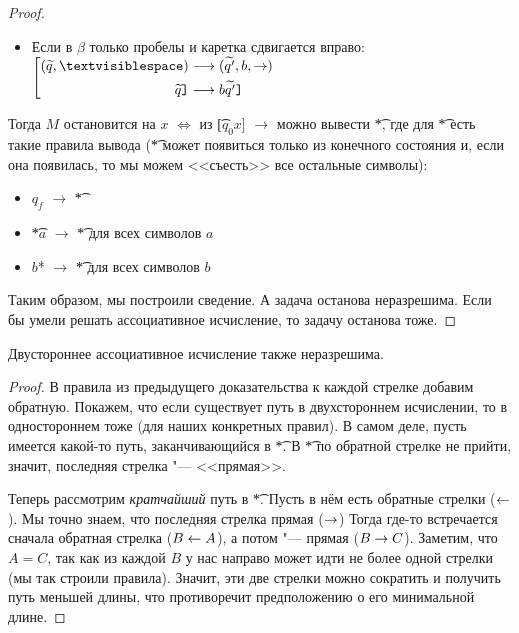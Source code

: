 \begin{proof}
\begin{itemize}
	\item Если в $\beta$ только пробелы и каретка сдвигается вправо:
		$\left[
			\begin{aligned}
				(\widetilde{q}, \textvisiblespace) &\longrightarrow (\widetilde{q'}, b, \rightarrow) \\
				\widetilde{q}\t{]} &\longrightarrow b\widetilde{q'}\t{]}
			\end{aligned}
		\right.$
	\end{itemize}

   Тогда $M$ остановится на $x$ $\iff$ из \t{[$q_0$$x$]} $\rightarrow$ можно вывести \t{*}, где для \t{*} есть такие правила вывода
   (\t{*} может появиться только из конечного состояния и, если она появилась, то мы можем <<съесть>> все остальные символы):

	\begin{itemize}
	\item $q_f$ $\rightarrow$ \t{*}
	\item \t{*$a$} $\rightarrow$ \t{*} для всех символов $a$
	\item \t{$b$*} $\rightarrow$ \t{*} для всех символов $b$
	\end{itemize}

   Таким образом, мы построили сведение.
   А задача останова неразрешима.
   Если бы умели решать ассоциативное исчисление, то задачу останова тоже.
\end{proof}

\begin{theorem}
	Двустороннее ассоциативное исчисление также неразрешима.
\end{theorem}
\begin{proof}
	В правила из предыдущего доказательства к каждой стрелке добавим обратную.
	Покажем, что если существует путь в двухстороннем исчислении, то в одностороннем тоже (для наших конкретных правил).
	В самом деле, пусть имеется какой-то путь, заканчивающийся в \t{*}.
	В \t{*} по обратной стрелке не прийти, значит, последняя стрелка "--- <<прямая>>.

	Теперь рассмотрим \textit{кратчайший} путь в \t{*}.
	Пусть в нём есть обратные стрелки ($\leftarrow$).
	Мы точно знаем, что последняя стрелка прямая ($\rightarrow$)
	Тогда где-то встречается сначала обратная стрелка ($B \leftarrow A$), а потом "--- прямая ($B \rightarrow C$).
	Заметим, что $A=C$, так как из каждой $B$ у нас направо может идти не более одной стрелки (мы так строили правила).
	Значит, эти две стрелки можно сократить и получить путь меньшей длины, что противоречит предположению о его минимальной длине.
\end{proof}

